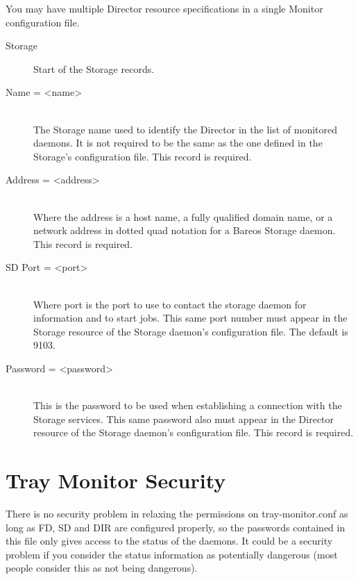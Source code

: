 You may have multiple Director resource specifications in a single Monitor
configuration file.

\begin{description}

\item [Storage]
Start of the Storage records.

\item [Name = {\textless}name{\textgreater}] \hfill \\
The Storage name used to identify  the Director in the list of monitored
daemons. It is not required  to be the same as the one defined in the Storage's
configuration file.  This record is required.

\item [Address = {\textless}address{\textgreater}] \hfill \\
Where the address is a host  name, a fully qualified domain name, or a network
address in  dotted quad notation for a Bareos Storage daemon.  This record is
required.

\item [SD Port = {\textless}port{\textgreater}] \hfill \\
Where port is the port to use to  contact the storage daemon for information
and to start jobs.  This same port number must appear in the Storage resource
of the  Storage daemon's configuration file. The default is 9103.

\item [Password = {\textless}password{\textgreater}] \hfill \\
This is the password to be used  when establishing a connection with the
Storage services. This  same password also must appear in the Director
resource of the Storage  daemon's configuration file. This record is required.

\end{description}

\section{Tray Monitor Security}

There is no security problem in relaxing the permissions on
tray-monitor.conf as long as FD, SD and DIR are configured properly, so
the passwords contained in this file only gives access to the status of
the daemons. It could be a security problem if you consider the status
information as potentially dangerous
(most people consider this as not being dangerous).

